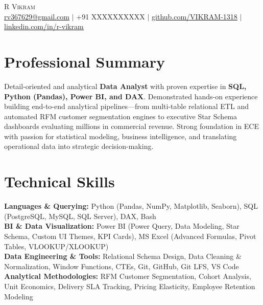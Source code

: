\documentclass[letterpaper,10pt]{article}
\begin{document}
\begin{center}
    {\Huge \scshape R Vikram} \\ \vspace{4pt}
    \small 
    \href{mailto:rv367629@gmail.com}{\underline{rv367629@gmail.com}} $|$ 
    +91 XXXXXXXXXX $|$ 
    \href{https://github.com/VIKRAM-1318}{\underline{github.com/VIKRAM-1318}} $|$ 
    \href{https://linkedin.com/in/your-profile}{\underline{linkedin.com/in/r-vikram}}
\end{center}

\vspace{-8pt}
\section{Professional Summary}
\small{
Detail-oriented and analytical \textbf{Data Analyst} with proven expertise in \textbf{SQL, Python (Pandas), Power BI, and DAX}. Demonstrated hands-on experience building end-to-end analytical pipelines—from multi-table relational ETL and automated RFM customer segmentation engines to executive Star Schema dashboards evaluating millions in commercial revenue. Strong foundation in ECE with passion for statistical modeling, business intelligence, and translating operational data into strategic decision-making.
}

\vspace{-4pt}
\section{Technical Skills}
\begin{itemize}[leftmargin=0.15in, label={}]
    \small{\item{
     \textbf{Languages \& Querying:} Python (Pandas, NumPy, Matplotlib, Seaborn), SQL (PostgreSQL, MySQL, SQL Server), DAX, Bash \\
     \textbf{BI \& Data Visualization:} Power BI (Power Query, Data Modeling, Star Schema, Custom UI Themes, KPI Cards), MS Excel (Advanced Formulas, Pivot Tables, VLOOKUP/XLOOKUP) \\
     \textbf{Data Engineering \& Tools:} Relational Schema Design, Data Cleaning \& Normalization, Window Functions, CTEs, Git, GitHub, Git LFS, VS Code \\
     \textbf{Analytical Methodologies:} RFM Customer Segmentation, Cohort Analysis, Unit Economics, Delivery SLA Tracking, Pricing Elasticity, Employee Retention Modeling
    }}
\end{itemize}
\end{document}
